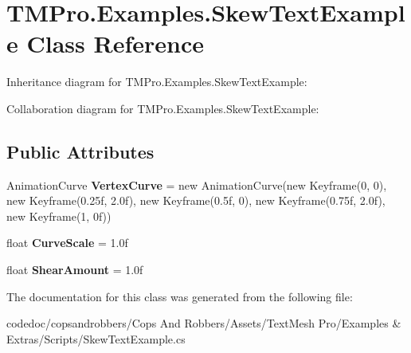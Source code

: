 \hypertarget{classTMPro_1_1Examples_1_1SkewTextExample}{}\section{T\+M\+Pro.\+Examples.\+Skew\+Text\+Example Class Reference}
\label{classTMPro_1_1Examples_1_1SkewTextExample}


Inheritance diagram for T\+M\+Pro.\+Examples.\+Skew\+Text\+Example\+:


Collaboration diagram for T\+M\+Pro.\+Examples.\+Skew\+Text\+Example\+:
\subsection*{Public Attributes}
\begin{DoxyCompactItemize}
\item 
\mbox{\label{classTMPro_1_1Examples_1_1SkewTextExample_a97a9859d8cdc12282e8bab29234cdf40}} 
Animation\+Curve {\bfseries Vertex\+Curve} = new Animation\+Curve(new Keyframe(0, 0), new Keyframe(0.\+25f, 2.\+0f), new Keyframe(0.\+5f, 0), new Keyframe(0.\+75f, 2.\+0f), new Keyframe(1, 0f))
\item 
\mbox{\label{classTMPro_1_1Examples_1_1SkewTextExample_a99a24dc0d0b4c3c9ae46c925a57031f1}} 
float {\bfseries Curve\+Scale} = 1.\+0f
\item 
\mbox{\label{classTMPro_1_1Examples_1_1SkewTextExample_a6f76ea16465a528676168b897d3d90a2}} 
float {\bfseries Shear\+Amount} = 1.\+0f
\end{DoxyCompactItemize}


The documentation for this class was generated from the following file\+:\begin{DoxyCompactItemize}
\item 
codedoc/copsandrobbers/\+Cops And Robbers/\+Assets/\+Text\+Mesh Pro/\+Examples \& Extras/\+Scripts/Skew\+Text\+Example.\+cs\end{DoxyCompactItemize}
